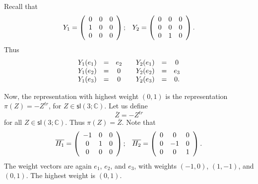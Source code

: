 \documentclass{amsbook}
\theoremstyle{plain}
\numberwithin{equation}{chapter}
\numberwithin{theorem}{chapter}
\begin{document}
Recall that
\[%
\begin{array}
[c]{cc}%
Y_{1}=\left(
\begin{array}
[c]{ccc}%
0 & 0 & 0\\
1 & 0 & 0\\
0 & 0 & 0
\end{array}
\right)  ; & Y_{2}=\left(
\begin{array}
[c]{ccc}%
0 & 0 & 0\\
0 & 0 & 0\\
0 & 1 & 0
\end{array}
\right)  \text{.}%
\end{array}
\]
Thus
\begin{equation}%
\begin{array}
[c]{ccccccc}%
Y_{1}(e_{1}) & = & e_{2} &  & Y_{2}(e_{1}) & = & 0\\
Y_{1}(e_{2}) & = & 0 &  & Y_{2}(e_{2}) & = & e_{3}\\
Y_{1}(e_{3}) & = & 0 &  & Y_{2}(e_{3}) & = & 0\text{.}%
\end{array}
\label{weight1.0}%
\end{equation}

Now, the representation with highest weight $\left(  0,1\right)  $ is the
representation $\pi(Z)=-Z^{tr}$, for $Z\in\mathsf{sl}\left(  3;\mathbb{C}%
\right)  $. Let us define
\[
\overline{Z}=-Z^{tr}%
\]
for all $Z\in\mathsf{sl}\left(  3;\mathbb{C}\right)  $. Thus $\pi
(Z)=\overline{Z}$. Note that
\[%
\begin{array}
[c]{cc}%
\overline{H_{1}}=\left(
\begin{array}
[c]{ccc}%
-1 & 0 & 0\\
0 & 1 & 0\\
0 & 0 & 0
\end{array}
\right)  ; & \overline{H_{2}}=\left(
\begin{array}
[c]{ccc}%
0 & 0 & 0\\
0 & -1 & 0\\
0 & 0 & 1
\end{array}
\right)  \text{.}%
\end{array}
\]
The weight vectors are again $e_{1}$, $e_{2}$, and $e_{3}$, with weights
$\left(  -1,0\right)  $, $\left(  1,-1\right)  $, and $\left(  0,1\right)  $.
The highest weight is $\left(  0,1\right)  $.
\end{document}
